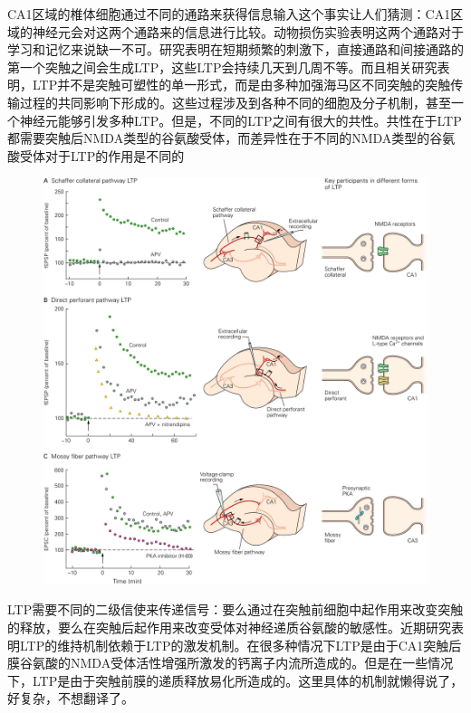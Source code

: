 \documentclass[UTF8,nofonts]{ctexart}
\begin{document}
CA1区域的椎体细胞通过不同的通路来获得信息输入这个事实让人们猜测：CA1区域的神经元会对这两个通路来的信息进行比较。动物损伤实验表明这两个通路对于学习和记忆来说缺一不可。研究表明在短期频繁的刺激下，直接通路和间接通路的第一个突触之间会生成LTP，这些LTP会持续几天到几周不等。而且相关研究表明，LTP并不是突触可塑性的单一形式，而是由多种加强海马区不同突触的突触传输过程的共同影响下形成的。这些过程涉及到各种不同的细胞及分子机制，甚至一个神经元能够引发多种LTP。但是，不同的LTP之间有很大的共性。共性在于LTP都需要突触后NMDA类型的谷氨酸受体，而差异性在于不同的NMDA类型的谷氨酸受体对于LTP的作用是不同的
\begin{figure}[h]
	\centering
	\includegraphics[scale=0.9]{Pic/6703_PNS5.jpg}
\end{figure}
LTP需要不同的二级信使来传递信号：要么通过在突触前细胞中起作用来改变突触的释放，要么在突触后起作用来改变受体对神经递质谷氨酸的敏感性。近期研究表明LTP的维持机制依赖于LTP的激发机制。在很多种情况下LTP是由于CA1突触后膜谷氨酸的NMDA受体活性增强所激发的钙离子内流所造成的。但是在一些情况下，LTP是由于突触前膜的递质释放易化所造成的。这里具体的机制就懒得说了，好复杂，不想翻译了。
\end{document}
